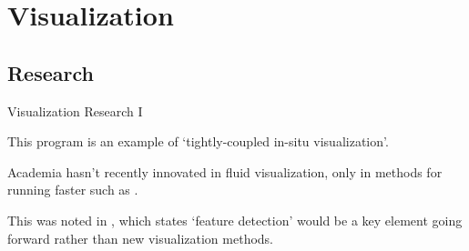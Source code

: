 \section{Visualization}
\subsection{Research}

\begin{frame}{Visualization Research I}
\begin{wideitemize}
    \item This program is an example of `tightly-coupled in-situ visualization'.
    \item Academia hasn't recently innovated in fluid visualization, only in methods for running faster such as .
    \item This was noted in , which states `feature detection' would be a key element going forward rather than new visualization methods.
\end{wideitemize}
\end{frame}

